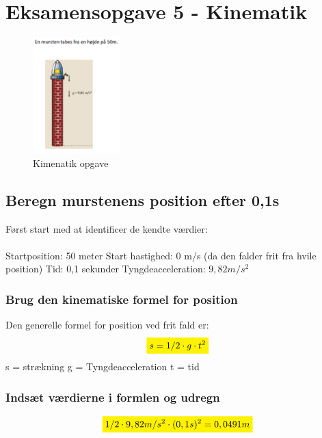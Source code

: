 \newpage
\section{Eksamensopgave 5 - Kinematik}
\begin{figure}[h!]
    \centering
    \includegraphics[width=0.3\textwidth]{figures/kinematik.png}
    \caption{Kimenatik opgave}
\end{figure}

\subsection{Beregn murstenens position efter 0,1s}
Først start med at identificer de kendte værdier:
\\\\
Startposition: 50 meter \newline
Start hastighed: 0 m/s (da den falder frit fra hvile position)\newline
Tid: 0,1 sekunder \newline
Tyngdeacceleration: \begin{math}9,82m/s^{2}\end{math}


\subsubsection{Brug den kinematiske formel for position}
Den generelle formel for position ved frit fald er:
\begin{equation*}
    \mathcolorbox{yellow}{s=1/2 \cdot g \cdot t^{2}}
\end{equation*}
s = strækning\newline
g = Tyngdeacceleration\newline
t = tid

\subsubsection{Indsæt værdierne i formlen og udregn}
\begin{equation*}
    \mathcolorbox{yellow}{1/2 \cdot 9,82m/s^{2} \cdot (0,1s)^{2}=0,0491m}
\end{equation*}

